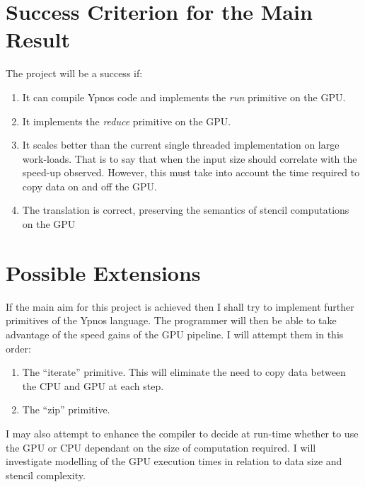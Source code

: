 \section*{Success Criterion for the Main Result}

The project will be a success if:

\begin{enumerate}

\item It can compile Ypnos code and implements the \emph{run} primitive on the 
GPU.

\item It implements the \emph{reduce} primitive on the GPU.

\item It scales better than the current single threaded implementation on large 
work-loads. That is to say that when the input size should correlate with the 
speed-up observed.  However, this must take into account the time required to 
copy data on and off the GPU.

\item The translation is correct, preserving the semantics of stencil 
computations on the GPU

\end{enumerate}

\section*{Possible Extensions}

If the main aim for this project is achieved then I shall try to implement 
further primitives of the Ypnos language. The programmer will then be able to 
take advantage of the speed gains of the GPU pipeline. I will attempt them in 
this order:

\begin{enumerate}

\item The ``iterate'' primitive. This will eliminate the need to copy data 
between the CPU and GPU at each step.

\item The ``zip'' primitive.

\end{enumerate}

I may also attempt to enhance the compiler to decide at run-time whether to use 
the GPU or CPU dependant on the size of computation required. I will 
investigate modelling of the GPU execution times in relation to data size and 
stencil complexity.

